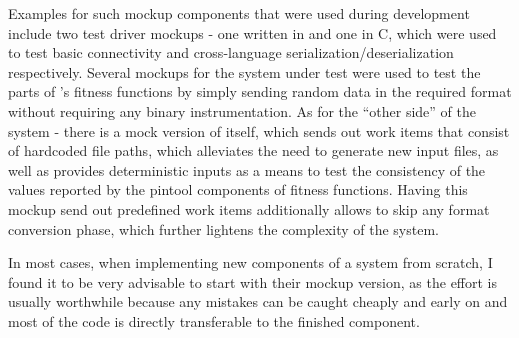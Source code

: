 Examples for such mockup components that were used during development include two test driver mockups - one
written in \java and one in {\small C}, which were used to test basic \zmq connectivity and
cross-language \msgpack serialization/deserialization respectively. Several mockups for the system under test
were used to test the \java parts of \xmlmate's fitness functions by simply sending random data in the
required \msgpack format without requiring any binary instrumentation. As for the ``other side'' of the system
- there is a mock version of \xmlmate itself, which sends out work items that consist of hardcoded file paths,
which alleviates the need to generate new input files, as well as provides deterministic inputs as a means to
test the consistency of the values reported by the pintool components of fitness functions. Having this mockup
send out predefined work items additionally allows to skip any format conversion phase, which further lightens
the complexity of the system. 

In most cases, when implementing new components of a system from scratch, I found it to be very advisable to
start with their mockup version, as the effort is usually worthwhile because any mistakes can be caught
cheaply and early on and most of the code is directly transferable to the finished component.
